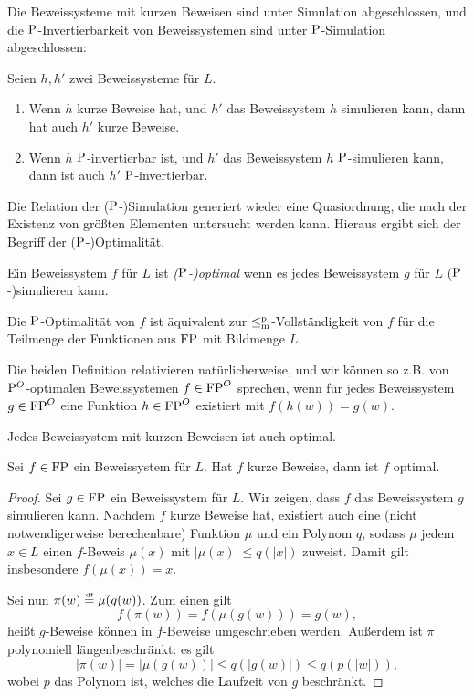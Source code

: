 Die Beweissysteme mit kurzen Beweisen sind unter Simulation abgeschlossen, und die $\P$-Invertierbarkeit von Beweissystemen sind unter $\P$-Simulation abgeschlossen:
\begin{observation}
    Seien $h, h'$ zwei Beweissysteme für $L$. \begin{enumerate}
        \item Wenn $h$ kurze Beweise hat, und $h'$ das Beweissystem $h$ simulieren kann, dann hat auch $h'$ kurze Beweise.
        \item Wenn $h$ $\P$-invertierbar ist, und $h'$ das Beweissystem $h$ $\P$-simulieren kann, dann ist auch $h'$ $\P$-invertierbar.
    \end{enumerate}
\end{observation}

Die Relation der ($\P$-)Simulation generiert wieder eine Quasiordnung, die nach der Existenz von größten  Elementen untersucht werden kann. 
Hieraus ergibt sich der Begriff der ($\P$-)Optimalität.
\begin{definition}
    Ein Beweissystem $f$ für $L$ ist \emph{($\P$-)optimal} wenn es jedes Beweissystem $g$ für $L$ ($\P$-)simulieren kann.

    Die $\P$-Optimalität von $f$ ist äquivalent zur $\leqmp$-Vollständigkeit von $f$ für die Teilmenge der Funktionen aus $\FP$ mit Bildmenge $L$.
\end{definition}
Die beiden Definition relativieren natürlicherweise, und wir können so z.B. von $\P^O$-optimalen Beweissystemen $f\in\FP^O$ sprechen, wenn für jedes Beweissystem $g\in\FP^O$ eine Funktion $h\in\FP^O$ existiert mit $f(h(w))=g(w)$.

Jedes Beweissystem mit kurzen Beweisen ist auch optimal.
\begin{observation}\label{obs:super-ps-sind-opt}
    Sei $f\in\FP$ ein Beweissystem für $L$. Hat $f$ kurze Beweise, dann ist $f$ optimal.
\end{observation}
\begin{proof}
    Sei $g\in\FP$ ein Beweissystem für $L$. Wir zeigen, dass $f$ das Beweissystem $g$ simulieren kann.
    Nachdem $f$ kurze Beweise hat, existiert auch eine (nicht notwendigerweise berechenbare) Funktion $\mu$ und ein Polynom $q$, sodass $\mu$ jedem $x\in L$ einen $f$-Beweis $\mu(x)$ mit $|\mu(x)|\leq q(|x|)$ zuweist. Damit gilt insbesondere $f(\mu(x)) = x$.

    Sei nun $\pi(w)\defeq\mu(g(w))$. Zum einen gilt
    \[ f(\pi(w)) = f(\mu(g(w))) = g(w), \]
    heißt $g$-Beweise können in $f$-Beweise umgeschrieben werden.
    Außerdem ist $\pi$ polynomiell längenbeschränkt: es gilt
    \[ |\pi(w)|=|\mu(g(w))| \leq q(|g(w)|) \leq q(p(|w|)), \]
    wobei $p$ das Polynom ist, welches die Laufzeit von $g$ beschränkt.
\end{proof}

